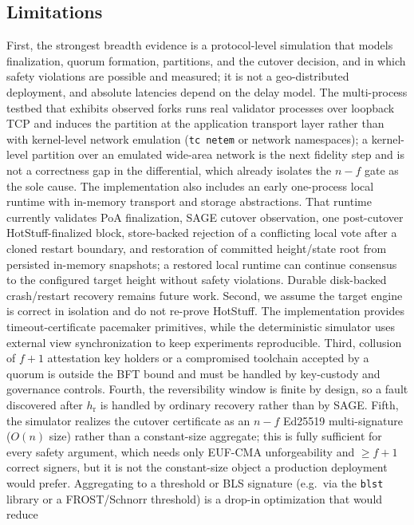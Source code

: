 \documentclass[journal]{IEEEtran}
\theoremstyle{remark}
\begin{document}
\subsection{Limitations}
First, the strongest breadth evidence is a protocol-level simulation that models finalization,
quorum formation, partitions, and the cutover decision, and in which safety violations are
possible and measured; it is not a geo-distributed deployment, and absolute latencies depend on
the delay model. The multi-process testbed that exhibits observed forks runs real validator
processes over loopback TCP and induces the partition at the application transport layer rather
than with kernel-level network emulation (\texttt{tc netem} or network namespaces); a
kernel-level partition over an emulated wide-area network is the next fidelity step and is not a
correctness gap in the differential, which already isolates the $n-f$ gate as the sole cause.
The implementation also includes an early one-process local runtime with
in-memory transport and storage abstractions. That runtime currently validates PoA finalization,
SAGE cutover observation, one post-cutover HotStuff-finalized block, store-backed rejection
of a conflicting local vote after a cloned restart boundary, and restoration of committed
height/state root from persisted in-memory snapshots; a restored local runtime can continue
consensus to the configured target height without safety violations. Durable disk-backed
crash/restart recovery remains future work. Second, we assume the target engine is correct in
isolation and do not re-prove HotStuff. The implementation provides timeout-certificate pacemaker
primitives, while the deterministic simulator uses external view synchronization to keep
experiments reproducible. Third, collusion of $f+1$ attestation key holders or a compromised
toolchain accepted by a quorum is outside the BFT bound and must be handled by key-custody and
governance controls. Fourth, the reversibility window is finite by design, so a fault discovered
after $h_{\mathrm{r}}$ is handled by ordinary recovery rather than by SAGE. Fifth, the simulator
realizes the cutover certificate as an $n-f$ Ed25519 multi-signature ($O(n)$ size) rather than a
constant-size aggregate; this is fully sufficient for every safety argument, which needs only
EUF-CMA unforgeability and $\ge f{+}1$ correct signers, but it is not the constant-size object a
production deployment would prefer. Aggregating to a threshold or BLS signature (e.g.\ via the
\texttt{blst} library or a FROST/Schnorr threshold) is a drop-in optimization that would reduce
\end{document}
